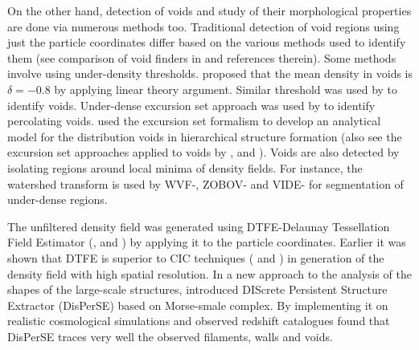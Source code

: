 On the other hand, detection of voids and study of their morphological properties are done via numerous methods too. Traditional detection of void regions using just the particle coordinates differ based on the various methods used to identify them (see comparison of void finders in \citealt{Colberg2008} and references therein). Some methods involve using under-density thresholds. \cite{Blumenthal1992} proposed that the mean density in voids is $\delta = -0.8$ by applying linear theory argument. Similar threshold was used by \cite{Colberg2005} to identify voids. Under-dense excursion set approach was used by \cite{Shandarin2006} to identify percolating voids. \cite{Sheth2003b} used the excursion set formalism to develop an analytical model for the distribution voids in hierarchical structure formation (also see the excursion set approaches applied to voids by \citealt{Paranjape2012}, \citealt{Jennings2013} and \citealt{Achitouv2015}). Voids are also detected by isolating regions around local minima of density fields. For instance, the watershed transform is used by WVF-\cite{Platen2007},  ZOBOV-\cite{Neyrinck2008} and VIDE-\cite{Sutter2015} for segmentation of under-dense regions. 


The unfiltered density field was generated using DTFE-Delaunay Tessellation Field Estimator (\citealt{Schaap2000}, \citealt{Weygaert2009a} and \citealt{Cautun2011b}) by applying it to the particle coordinates. Earlier it was shown that DTFE is superior to CIC techniques (\citealt{Schaap2007} and \citealt{Weygaert2009a}) in generation of the density field with high spatial resolution. In a new approach to the analysis of the shapes of the large-scale structures, \cite{Sousbie2011f} introduced DIScrete Persistent Structure Extractor ({DisPerSE}) based on Morse-smale complex. By implementing it on realistic cosmological simulations and observed redshift catalogues \cite{Sousbie2011e} found that DisPerSE traces very well the observed filaments, walls and voids.

